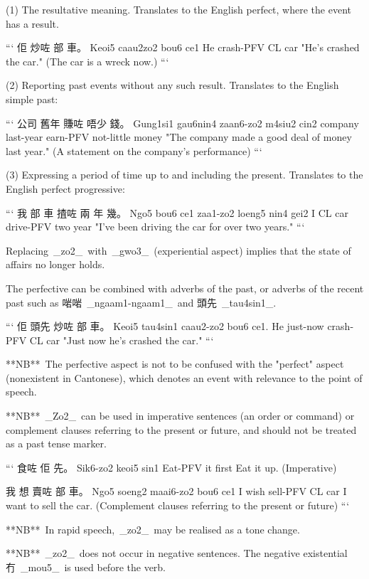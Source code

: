 (1) The resultative meaning. Translates to the English perfect, where the event has a result.

```
佢      炒咗        部     車。
Keoi5   caau2zo2    bou6   ce1  
He      crash-PFV  CL     car
"He's crashed the car." (The car is a wreck now.)
```

(2) Reporting past events without any such result. Translates to the English simple past:

```
公司      舊年       賺咗       唔少         錢。
Gung1si1  gau6nin4  zaan6-zo2  m4siu2       cin2
company   last-year earn-PFV   not-little   money
"The company made a good deal of money last year."
(A statement on the company's performance)
```

(3) Expressing a period of time up to and including the present. Translates to the English perfect progressive:

```
我    部    車    揸咗       兩      年    幾。
Ngo5  bou6  ce1  zaa1-zo2   loeng5  nin4  gei2
I     CL    car  drive-PFV  two     year
"I've been driving the car for over two years."
```

Replacing _zo2_ with _gwo3_ (experiential aspect) implies that the state of affairs no longer holds.

The perfective can be combined with adverbs of the past, or adverbs of the recent past such as 啱啱 _ngaam1-ngaam1_ and 頭先 _tau4sin1_.

```
佢      頭先        炒咗        部     車。
Keoi5   tau4sin1   caau2-zo2   bou6   ce1. 
He      just-now   crash-PFV   CL     car
"Just now he's crashed the car."
```

**NB** The perfective aspect is not to be confused with the "perfect" aspect (nonexistent in Cantonese), which denotes an event with relevance to the point of speech.

**NB** _Zo2_ can be used in imperative sentences (an order or command) or complement clauses referring to the present or future, and should not be treated as a past tense marker.

```
食咗      佢     先。
Sik6-zo2  keoi5 sin1
Eat-PFV   it    first
Eat it up. (Imperative)

我   想      賣咗         部    車。
Ngo5 soeng2  maai6-zo2   bou6  ce1
I    wish    sell-PFV    CL    car
I want to sell the car. (Complement clauses referring to the present or future)
```

**NB** In rapid speech, _zo2_ may be realised as a tone change.

**NB** _zo2_ does not occur in negative sentences. The negative existential 冇 _mou5_ is used before the verb.


